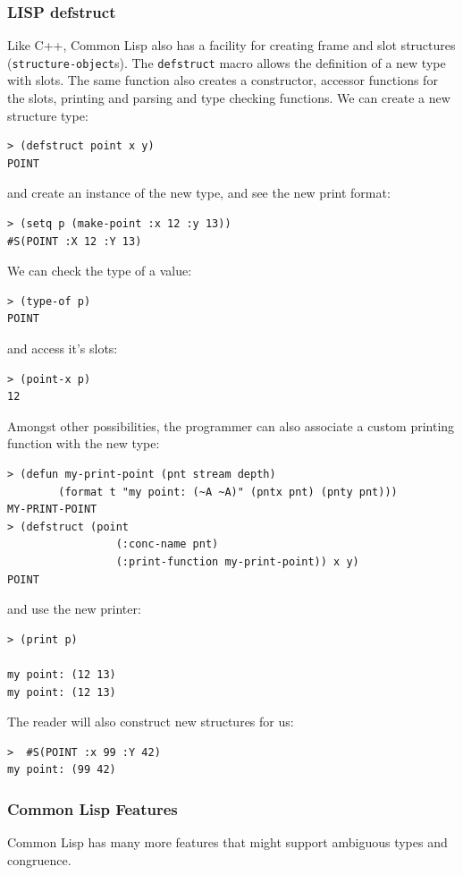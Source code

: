 \documentclass[a4paper,12pt,dvips]{article}
\begin{document}
\subsubsection{LISP defstruct}
Like C++, Common Lisp also has a facility for creating frame and slot structures (\texttt{structure-object}s). The \verb*|defstruct| macro allows the definition of a new type with slots. The same function also creates a constructor, accessor functions for the slots, printing and parsing and type checking functions. We can create a new structure type:
\begin{verbatim}
> (defstruct point x y) 
POINT
\end{verbatim}
and create an instance of the new type, and see the new print format:
\begin{verbatim}
> (setq p (make-point :x 12 :y 13))  
#S(POINT :X 12 :Y 13)                
\end{verbatim}
We can check the type of a value:
\begin{verbatim}
> (type-of p)
POINT
\end{verbatim}
and access it's slots:
\begin{verbatim}
> (point-x p)
12
\end{verbatim}
Amongst other possibilities, the programmer can also associate a custom printing function with the new type: 
\begin{verbatim}
> (defun my-print-point (pnt stream depth) 
        (format t "my point: (~A ~A)" (pntx pnt) (pnty pnt)))
MY-PRINT-POINT
> (defstruct (point 
                 (:conc-name pnt) 
                 (:print-function my-print-point)) x y)
POINT
\end{verbatim}
and use the new printer:
\begin{verbatim}
> (print p) 

my point: (12 13)
my point: (12 13)
\end{verbatim}
The reader will also construct new structures for us:
\begin{verbatim}
>  #S(POINT :x 99 :Y 42)
my point: (99 42)
\end{verbatim}

\subsubsection{Common Lisp Features}
Common Lisp has many more features that might support ambiguous types and congruence.  
\end{document}
